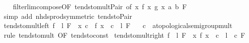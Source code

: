 \begin{isabellebody}
%
\isadelimproof
\ \ %
\endisadelimproof
%
\isatagproof
{}\isamarkupfalse%
\ filterlim{\isacharunderscore}{\kern0pt}compose{\isacharbrackleft}{\kern0pt}OF\ tendsto{\isacharunderscore}{\kern0pt}mult{\isacharunderscore}{\kern0pt}Pair{\isacharcomma}{\kern0pt}\ of\ {\isachardoublequoteopen}{\isasymlambda}x{\isachardot}{\kern0pt}\ {\isacharparenleft}{\kern0pt}f\ x{\isacharcomma}{\kern0pt}\ g\ x{\isacharparenright}{\kern0pt}{\isachardoublequoteclose}\ a\ b\ F{\isacharbrackright}{\kern0pt}\isanewline
\ \ \isamarkupfalse%
\ {\isacharparenleft}{\kern0pt}simp\ add{\isacharcolon}{\kern0pt}\ nhds{\isacharunderscore}{\kern0pt}prod{\isacharbrackleft}{\kern0pt}symmetric{\isacharbrackright}{\kern0pt}\ tendsto{\isacharunderscore}{\kern0pt}Pair{\isacharparenright}{\kern0pt}%
\endisatagproof
{\isafoldproof}%
%
\isadelimproof
\isanewline
%
\endisadelimproof
\isanewline
{}\isamarkupfalse%
\ tendsto{\isacharunderscore}{\kern0pt}mult{\isacharunderscore}{\kern0pt}left{\isacharcolon}{\kern0pt}\ {\isachardoublequoteopen}{\isacharparenleft}{\kern0pt}f\ {\isasymlonglongrightarrow}\ l{\isacharparenright}{\kern0pt}\ F\ {\isasymLongrightarrow}\ {\isacharparenleft}{\kern0pt}{\isacharparenleft}{\kern0pt}{\isasymlambda}x{\isachardot}{\kern0pt}\ c\ {\isacharasterisk}{\kern0pt}\ {\isacharparenleft}{\kern0pt}f\ x{\isacharparenright}{\kern0pt}{\isacharparenright}{\kern0pt}\ {\isasymlonglongrightarrow}\ c\ {\isacharasterisk}{\kern0pt}\ l{\isacharparenright}{\kern0pt}\ F{\isachardoublequoteclose}\isanewline
\ \ \ c\ {\isacharcolon}{\kern0pt}{\isacharcolon}{\kern0pt}\ {\isachardoublequoteopen}{\isacharprime}{\kern0pt}a{\isacharcolon}{\kern0pt}{\isacharcolon}{\kern0pt}topological{\isacharunderscore}{\kern0pt}semigroup{\isacharunderscore}{\kern0pt}mult{\isachardoublequoteclose}\isanewline
%
\isadelimproof
\ \ %
\endisadelimproof
%
\isatagproof
{}\isamarkupfalse%
\ {\isacharparenleft}{\kern0pt}rule\ tendsto{\isacharunderscore}{\kern0pt}mult\ {\isacharbrackleft}{\kern0pt}OF\ tendsto{\isacharunderscore}{\kern0pt}const{\isacharbrackright}{\kern0pt}{\isacharparenright}{\kern0pt}%
\endisatagproof
{\isafoldproof}%
%
\isadelimproof
\isanewline
%
\endisadelimproof
\isanewline
{}\isamarkupfalse%
\ tendsto{\isacharunderscore}{\kern0pt}mult{\isacharunderscore}{\kern0pt}right{\isacharcolon}{\kern0pt}\ {\isachardoublequoteopen}{\isacharparenleft}{\kern0pt}f\ {\isasymlonglongrightarrow}\ l{\isacharparenright}{\kern0pt}\ F\ {\isasymLongrightarrow}\ {\isacharparenleft}{\kern0pt}{\isacharparenleft}{\kern0pt}{\isasymlambda}x{\isachardot}{\kern0pt}\ {\isacharparenleft}{\kern0pt}f\ x{\isacharparenright}{\kern0pt}\ {\isacharasterisk}{\kern0pt}\ c{\isacharparenright}{\kern0pt}\ {\isasymlonglongrightarrow}\ l\ {\isacharasterisk}{\kern0pt}\ c{\isacharparenright}{\kern0pt}\ F{\isachardoublequoteclose}\isanewline

\end{isabellebody}
